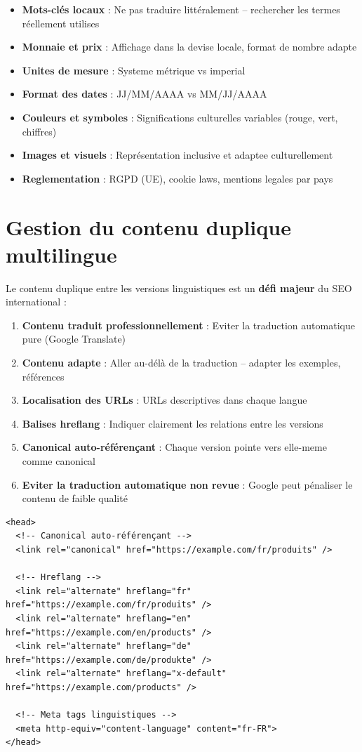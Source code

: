 \documentclass[12pt,a4paper,twoside]{report}
\newcommand{\important}[1]{\textbf{\textcolor{googlered}{#1}}}
\begin{document}
\begin{itemize}
    \item \textbf{Mots-clés locaux} : Ne pas traduire littéralement -- rechercher les termes réellement utilises
    \item \textbf{Monnaie et prix} : Affichage dans la devise locale, format de nombre adapte
    \item \textbf{Unites de mesure} : Systeme métrique vs imperial
    \item \textbf{Format des dates} : JJ/MM/AAAA vs MM/JJ/AAAA
    \item \textbf{Couleurs et symboles} : Significations culturelles variables (rouge, vert, chiffres)
    \item \textbf{Images et visuels} : Représentation inclusive et adaptee culturellement
    \item \textbf{Reglementation} : RGPD (UE), cookie laws, mentions legales par pays
\end{itemize}

\section{Gestion du contenu duplique multilingue}

Le contenu duplique entre les versions linguistiques est un \important{défi majeur} du SEO international :

\begin{enumerate}
    \item \textbf{Contenu traduit professionnellement} : Eviter la traduction automatique pure (Google Translate)
    \item \textbf{Contenu adapte} : Aller au-délà de la traduction -- adapter les exemples, références
    \item \textbf{Localisation des URLs} : URLs descriptives dans chaque langue
    \item \textbf{Balises hreflang} : Indiquer clairement les relations entre les versions
    \item \textbf{Canonical auto-référençant} : Chaque version pointe vers elle-meme comme canonical
    \item \textbf{Eviter la traduction automatique non revue} : Google peut pénaliser le contenu de faible qualité
\end{enumerate}

\begin{lstlisting}[style=htmlcode,caption={Canonical et hreflang combines correctement}]
<head>
  <!-- Canonical auto-référençant -->
  <link rel="canonical" href="https://example.com/fr/produits" />

  <!-- Hreflang -->
  <link rel="alternate" hreflang="fr" href="https://example.com/fr/produits" />
  <link rel="alternate" hreflang="en" href="https://example.com/en/products" />
  <link rel="alternate" hreflang="de" href="https://example.com/de/produkte" />
  <link rel="alternate" hreflang="x-default" href="https://example.com/products" />

  <!-- Meta tags linguistiques -->
  <meta http-equiv="content-language" content="fr-FR">
</head>
\end{lstlisting}
\end{document}
